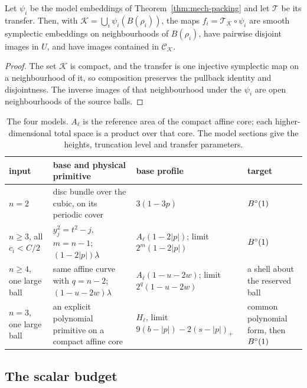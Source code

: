\begin{proposition}[Assembly]\label{prop:mech-assembly}
Let $\psi_i$ be the model embeddings of Theorem~\ref{thm:mech-packing} and let $\mathcal T$ be its transfer.
Then, with $\mathcal K=\bigcup_i\psi_i(B(\rho_i))$, the maps
$f_i=\mathcal T_{\mathcal K}\circ\psi_i$ are smooth symplectic embeddings on neighbourhoods of
$B(\rho_i)$, have pairwise disjoint images in $U$, and have images contained in $\mathcal C_{\mathcal K}$.
\end{proposition}
\begin{proof}
The set $\mathcal K$ is compact, and the transfer is one injective symplectic map on a neighbourhood of
it, so composition preserves the pullback identity and disjointness. The inverse images of that
neighbourhood under the $\psi_i$ are open neighbourhoods of the source balls.
\end{proof}

\begin{table}[ht]
\centering\footnotesize
\renewcommand{\arraystretch}{1.2}
\begin{tabular}{@{}L{.16\textwidth}L{.24\textwidth}L{.25\textwidth}L{.25\textwidth}@{}}
\toprule
input & base and physical primitive & base profile & target\\\midrule
$n=2$ & disc bundle over the cubic, on its periodic cover & $3(1-3p)$ & $B^{\circ}(1)$\\
$n\ge3$, all $c_i<C/2$ & $y_j^2=t^2-j$, $m=n-1$; $(1-2|p|)\lambda$ & $A_\ell(1-2|p|)$; limit $2^m(1-2|p|)$ & $B^{\circ}(1)$\\
$n\ge4$, one large ball & same affine curve with $q=n-2$; $(1-u-2w)\lambda$ & $A_\ell(1-u-2w)$; limit $2^q(1-u-2w)$ & a shell about the reserved ball\\
$n=3$, one large ball & an explicit polynomial primitive on a compact affine core & $H_\ell$, limit $9(b-|p|)-2(s-|p|)_+$ & common polynomial form, then $B^{\circ}(1)$\\\bottomrule
\end{tabular}
\caption{The four models. $A_\ell$ is the reference area of the compact affine core; each
higher-dimensional total space is a product over that core. The model sections give the heights,
truncation level and transfer parameters.}
\label{tab:mech-models}
\end{table}

\subsection{The scalar budget}\label{sec:mech-volume}

